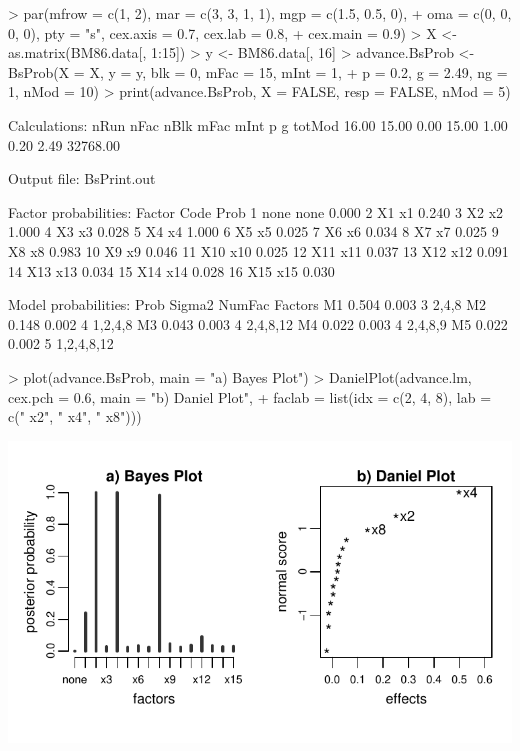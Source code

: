 \documentclass[letterpaper]{article}
\begin{document}
\begin{center}
\begin{Schunk}
\begin{Sinput}
> par(mfrow = c(1, 2), mar = c(3, 3, 1, 1), mgp = c(1.5, 0.5, 0), 
+     oma = c(0, 0, 0, 0), pty = "s", cex.axis = 0.7, cex.lab = 0.8, 
+     cex.main = 0.9)
> X <- as.matrix(BM86.data[, 1:15])
> y <- BM86.data[, 16]
> advance.BsProb <- BsProb(X = X, y = y, blk = 0, mFac = 15, mInt = 1, 
+     p = 0.2, g = 2.49, ng = 1, nMod = 10)
> print(advance.BsProb, X = FALSE, resp = FALSE, nMod = 5)
\end{Sinput}
\begin{Soutput}
 Calculations:
    nRun     nFac     nBlk     mFac     mInt        p        g   totMod 
   16.00    15.00     0.00    15.00     1.00     0.20     2.49 32768.00 

 Output file: BsPrint.out

 Factor probabilities:
   Factor Code  Prob
1    none none 0.000
2      X1   x1 0.240
3      X2   x2 1.000
4      X3   x3 0.028
5      X4   x4 1.000
6      X5   x5 0.025
7      X6   x6 0.034
8      X7   x7 0.025
9      X8   x8 0.983
10     X9   x9 0.046
11    X10  x10 0.025
12    X11  x11 0.037
13    X12  x12 0.091
14    X13  x13 0.034
15    X14  x14 0.028
16    X15  x15 0.030

 Model probabilities:
   Prob  Sigma2 NumFac Factors   
M1 0.504 0.003  3      2,4,8     
M2 0.148 0.002  4      1,2,4,8   
M3 0.043 0.003  4      2,4,8,12  
M4 0.022 0.003  4      2,4,8,9   
M5 0.022 0.002  5      1,2,4,8,12
\end{Soutput}
\begin{Sinput}
> plot(advance.BsProb, main = "a) Bayes Plot")
> DanielPlot(advance.lm, cex.pch = 0.6, main = "b) Daniel Plot", 
+     faclab = list(idx = c(2, 4, 8), lab = c(" x2", " x4", " x8")))
\end{Sinput}
\end{Schunk}
\includegraphics{BsMD-007}
\end{center}
\end{document}
